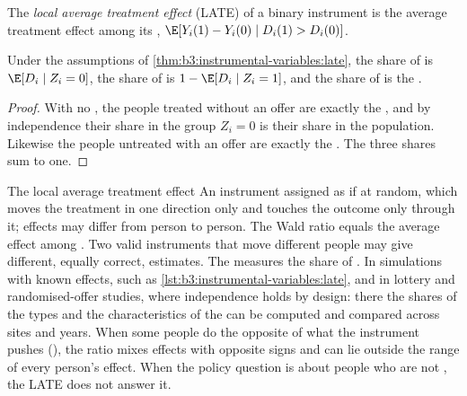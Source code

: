 \begin{definition}\label{def:b3:instrumental-variables:late}
The \emph{local average treatment effect} (LATE) of a binary instrument is the
average treatment effect among its , $\E[Y_i(1) - Y_i(0) \mid D_i(1)
> D_i(0)]$.
\end{definition}

\begin{corollary}\label{cor:b3:instrumental-variables:shares}
Under the assumptions of \cref{thm:b3:instrumental-variables:late}, the share
of  is $\E[D_i \mid Z_i = 0]$, the share of  is
$1 - \E[D_i \mid Z_i = 1]$, and the share of  is the .
\end{corollary}

\begin{proof}
With no , the people treated without an offer are exactly the
, and by independence their share in the group $Z_i = 0$ is their
share in the population. Likewise the people untreated with an offer are
exactly the . The three shares sum to one.
\end{proof}

\begin{model}{The local average treatment effect}
\assumes An instrument assigned as if at random, which moves the treatment in
one direction only and touches the outcome only through it; effects may differ
from person to person.
\predicts The Wald ratio equals the average effect among . Two valid
instruments that move different people may give different, equally correct,
estimates. The  measures the share of .
\tested In simulations with known effects, such as
\cref{lst:b3:instrumental-variables:late}, and in lottery and randomised-offer
studies, where independence holds by design: there the shares of the types and
the characteristics of the  can be computed and compared across sites
and years.
\breaks When some people do the opposite of what the instrument pushes
(), the ratio mixes effects with opposite signs and can lie outside the
range of every person's effect. When the policy question is about people who
are not , the LATE does not answer it.
\end{model}

